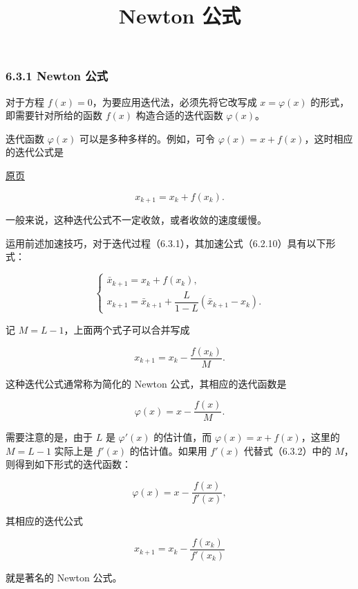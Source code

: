 \documentclass[
  10pt,
  fontset=fandol]{ctexart}
\title{Newton 公式}
\author{}
\date{}
\begin{document}
\maketitle

\subsubsection{6.3.1 Newton 公式}\label{newton-ux516cux5f0f}

对于方程 \(f(x)=0\)，为要应用迭代法，必须先将它改写成 \(x=\varphi(x)\) 的形式，即需要针对所给的函数 \(f(x)\) 构造合适的迭代函数 \(\varphi(x)\)。

迭代函数 \(\varphi(x)\) 可以是多种多样的。例如，可令 \(\varphi(x)=x+f(x)\)，这时相应的迭代公式是

\href{../../source-images/pdf-163.jpeg}{原页}

\[
x_{k+1}=x_k+f(x_k).
\tag{6.3.1}
\]

一般来说，这种迭代公式不一定收敛，或者收敛的速度缓慢。

运用前述加速技巧，对于迭代过程（6.3.1），其加速公式（6.2.10）具有以下形式：

\[
\begin{cases}
\bar{x}_{k+1}=x_k+f(x_k),\\
x_{k+1}=\bar{x}_{k+1}+\dfrac{L}{1-L}(\bar{x}_{k+1}-x_k).
\end{cases}
\]

记 \(M=L-1\)，上面两个式子可以合并写成

\[
x_{k+1}=x_k-\frac{f(x_k)}{M}.
\]

这种迭代公式通常称为简化的 Newton 公式，其相应的迭代函数是

\[
\varphi(x)=x-\frac{f(x)}{M}.
\tag{6.3.2}
\]

需要注意的是，由于 \(L\) 是 \(\varphi'(x)\) 的估计值，而 \(\varphi(x)=x+f(x)\)，这里的 \(M=L-1\) 实际上是 \(f'(x)\) 的估计值。如果用 \(f'(x)\) 代替式（6.3.2）中的 \(M\)，则得到如下形式的迭代函数：

\[
\varphi(x)=x-\frac{f(x)}{f'(x)},
\]

其相应的迭代公式

\[
x_{k+1}=x_k-\frac{f(x_k)}{f'(x_k)}
\tag{6.3.3}
\]

就是著名的 Newton 公式。
\end{document}
